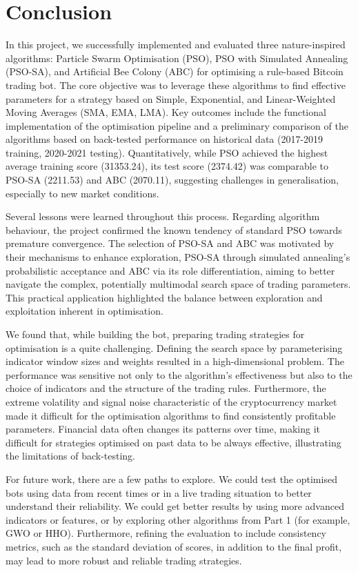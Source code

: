\documentclass[a4paper, 12pt]{extarticle}
\begin{document}
\section{Conclusion}
In this project, we successfully implemented and evaluated three nature-inspired algorithms: Particle Swarm Optimisation (PSO), PSO with Simulated Annealing (PSO-SA), and Artificial Bee Colony (ABC) for optimising a rule-based Bitcoin trading bot. The core objective was to leverage these algorithms to find effective parameters for a strategy based on Simple, Exponential, and Linear-Weighted Moving Averages (SMA, EMA, LMA). Key outcomes include the functional implementation of the optimisation pipeline and a preliminary comparison of the algorithms based on back-tested performance on historical data (2017-2019 training, 2020-2021 testing). Quantitatively, while PSO achieved the highest average training score (31353.24), its test score (2374.42) was comparable to PSO-SA (2211.53) and ABC (2070.11), suggesting challenges in generalisation, especially to new market conditions. 

Several lessons were learned throughout this process. Regarding algorithm behaviour, the project confirmed the known tendency of standard PSO towards premature convergence. The selection of PSO-SA and ABC was motivated by their mechanisms to enhance exploration, PSO-SA through simulated annealing's probabilistic acceptance and ABC via its role differentiation, aiming to better navigate the complex, potentially multimodal search space of trading parameters. This practical application highlighted the balance between exploration and exploitation inherent in optimisation. 

We found that, while building the bot, preparing trading strategies for optimisation is a quite challenging. Defining the search space by parameterising indicator window sizes and weights resulted in a high-dimensional problem. The performance was sensitive not only to the algorithm's effectiveness but also to the choice of indicators and the structure of the trading rules. Furthermore, the extreme volatility and signal noise characteristic of the cryptocurrency market made it difficult for the optimisation algorithms to find consistently profitable parameters. Financial data often changes its patterns over time, making it difficult for strategies optimised on past data to be always effective, illustrating the limitations of back-testing. 

For future work, there are a few paths to explore. We could test the optimised bots using data from recent times or in a live trading situation to better understand their reliability. We could get better results by using more advanced indicators or features, or by exploring other algorithms from Part 1 (for example, GWO or HHO). Furthermore, refining the evaluation to include consistency metrics, such as the standard deviation of scores, in addition to the final profit, may lead to more robust and reliable trading strategies. 
\end{document}
